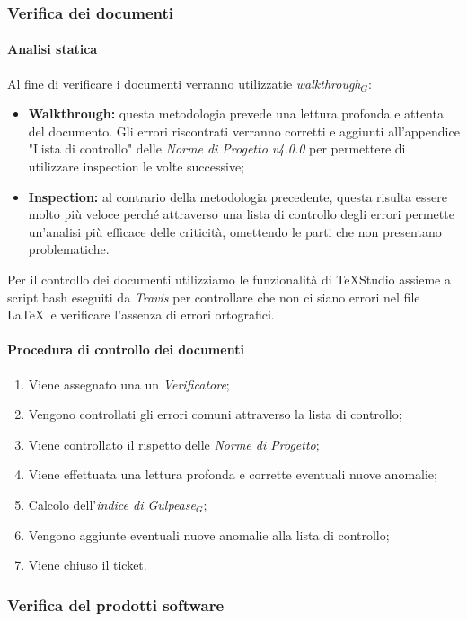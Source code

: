 \subsubsection{Verifica dei documenti}
\paragraph{Analisi statica}
Al fine di verificare i documenti verranno utilizzatie \textit{walkthrough$_{G}$}:
\begin{itemize}
	\item \textbf{Walkthrough:} questa metodologia prevede una lettura profonda e attenta del documento. Gli errori riscontrati verranno corretti e aggiunti all'appendice "Lista di controllo" delle \textit{Norme di Progetto v4.0.0} per permettere di utilizzare inspection le volte successive;
	\item \textbf{Inspection:} al contrario della metodologia precedente, questa risulta essere molto più veloce perché attraverso una lista di controllo degli errori permette un'analisi più efficace delle criticità, omettendo le parti che non presentano problematiche. 
\end{itemize}
Per il controllo dei documenti utilizziamo le funzionalità di TeXStudio assieme a script bash eseguiti da \textit{Travis} per controllare che non ci siano errori nel file \LaTeX\  e verificare l'assenza di errori ortografici. 
\paragraph{Procedura di controllo dei documenti}
\begin{enumerate}
	\item Viene assegnato una un \textit{Verificatore};
	\item Vengono controllati gli errori comuni attraverso la lista di controllo;
	\item Viene controllato il rispetto delle \textit{Norme di Progetto};
	\item Viene effettuata una lettura profonda e corrette eventuali nuove anomalie;
	\item Calcolo dell'\textit{indice di Gulpease$_{G}$};
	\item Vengono aggiunte eventuali nuove anomalie alla lista di controllo;
	\item Viene chiuso il ticket.
\end{enumerate}
\subsubsection{Verifica del prodotti software}

